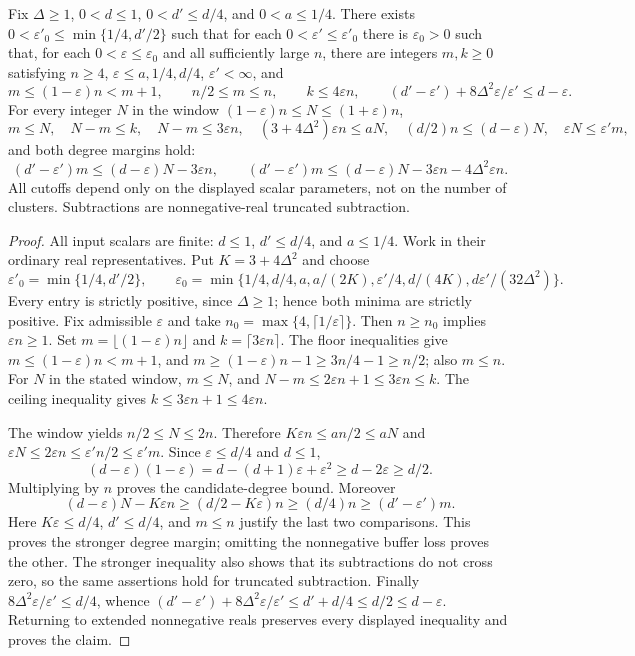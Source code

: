 \begin{lemma}
Fix $\Delta\geq1$, $0<d\leq1$, $0<d'\leq d/4$, and $0<a\leq1/4$.
There exists $0<\varepsilon'_0\leq\min\{1/4,d'/2\}$ such that for each
$0<\varepsilon'\leq\varepsilon'_0$ there is $\varepsilon_0>0$ such that,
for each $0<\varepsilon\leq\varepsilon_0$ and all sufficiently large $n$,
there are integers $m,k\geq0$ satisfying $n\geq4$,
$\varepsilon\leq a,1/4,d/4$, $\varepsilon'<\infty$, and
\[
 m\leq(1-\varepsilon)n<m+1,\qquad n/2\leq m\leq n,
 \qquad k\leq4\varepsilon n,
 \qquad (d'-\varepsilon')+8\Delta^2\varepsilon/\varepsilon'\leq d-\varepsilon.
\]
For every integer $N$ in the window $(1-\varepsilon)n\leq N\leq(1+\varepsilon)n$,
\[
 m\leq N,\quad N-m\leq k,\quad N-m\leq3\varepsilon n,\quad
 (3+4\Delta^2)\varepsilon n\leq aN,\quad
 (d/2)n\leq(d-\varepsilon)N,\quad \varepsilon N\leq\varepsilon'm,
\]
and both degree margins hold:
\[
 (d'-\varepsilon')m\leq(d-\varepsilon)N-3\varepsilon n,
 \qquad
 (d'-\varepsilon')m\leq(d-\varepsilon)N-3\varepsilon n-4\Delta^2\varepsilon n.
\]
All cutoffs depend only on the displayed scalar parameters, not on the
number of clusters. Subtractions are nonnegative-real truncated subtraction.
\end{lemma}
\begin{proof}
All input scalars are finite: $d\leq1$, $d'\leq d/4$, and $a\leq1/4$.
Work in their ordinary real representatives. Put $K=3+4\Delta^2$ and choose
\[
 \varepsilon'_0=\min\{1/4,d'/2\},\qquad
 \varepsilon_0=\min\{1/4,d/4,a,a/(2K),\varepsilon'/4,
                    d/(4K),d\varepsilon'/(32\Delta^2)\}.
\]
Every entry is strictly positive, since $\Delta\geq1$; hence both minima
are strictly positive. Fix admissible $\varepsilon$ and take
$n_0=\max\{4,\lceil1/\varepsilon\rceil\}$. Then $n\geq n_0$ implies
$\varepsilon n\geq1$. Set $m=\lfloor(1-\varepsilon)n\rfloor$ and
$k=\lceil3\varepsilon n\rceil$. The floor inequalities give
$m\leq(1-\varepsilon)n<m+1$, and
$m\geq(1-\varepsilon)n-1\geq3n/4-1\geq n/2$; also $m\leq n$.
For $N$ in the stated window, $m\leq N$, and
$N-m\leq2\varepsilon n+1\leq3\varepsilon n\leq k$.
The ceiling inequality gives $k\leq3\varepsilon n+1\leq4\varepsilon n$.

The window yields $n/2\leq N\leq2n$. Therefore
$K\varepsilon n\leq an/2\leq aN$ and
$\varepsilon N\leq2\varepsilon n\leq\varepsilon'n/2\leq\varepsilon'm$.
Since $\varepsilon\leq d/4$ and $d\leq1$,
\[
 (d-\varepsilon)(1-\varepsilon)
 =d-(d+1)\varepsilon+\varepsilon^2
 \geq d-2\varepsilon\geq d/2.
\]
Multiplying by $n$ proves the candidate-degree bound. Moreover
\[
 (d-\varepsilon)N-K\varepsilon n
 \geq(d/2-K\varepsilon)n\geq(d/4)n
 \geq(d'-\varepsilon')m.
\]
Here $K\varepsilon\leq d/4$, $d'\leq d/4$, and $m\leq n$ justify the
last two comparisons. This proves the stronger degree margin; omitting
the nonnegative buffer loss proves the other. The stronger inequality
also shows that its subtractions do not cross zero, so the same assertions
hold for truncated subtraction. Finally
$8\Delta^2\varepsilon/\varepsilon'\leq d/4$, whence
$(d'-\varepsilon')+8\Delta^2\varepsilon/\varepsilon'\leq d'+d/4
\leq d/2\leq d-\varepsilon$. Returning to extended nonnegative reals
preserves every displayed inequality and proves the claim.
\end{proof}
